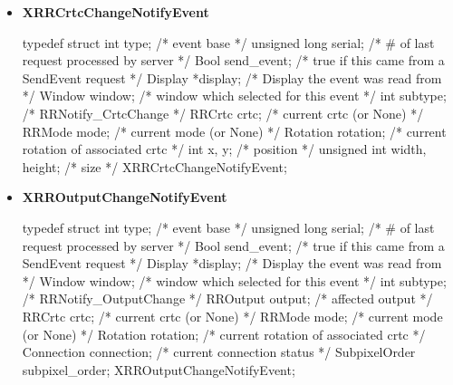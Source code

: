 \documentclass{report}
\begin{document}
\begin{itemize}
\begin{cppcode}
                    \end{cppcode}
                \item \textbf{XRRCrtcChangeNotifyEvent}
                    \bigbreak \noindent 
                    \begin{cppcode}
                        typedef struct {
                            int type;			/* event base */
                            unsigned long serial;	/* # of last request processed by server */
                            Bool send_event;		/* true if this came from a SendEvent request */
                            Display *display;		/* Display the event was read from */
                            Window window;		/* window which selected for this event */
                            int subtype;		/* RRNotify_CrtcChange */
                            RRCrtc crtc;    		/* current crtc (or None) */
                            RRMode mode;	    	/* current mode (or None) */
                            Rotation rotation;		/* current rotation of associated crtc */
                            int x, y;			/* position */
                            unsigned int width, height;	/* size */
                        } XRRCrtcChangeNotifyEvent;
                    \end{cppcode}
                \item \textbf{XRROutputChangeNotifyEvent}
                    \bigbreak \noindent 
                    \begin{cppcode}
                        typedef struct {
                            int type;			/* event base */
                            unsigned long serial;	/* # of last request processed by server */
                            Bool send_event;		/* true if this came from a SendEvent request */
                            Display *display;		/* Display the event was read from */
                            Window window;		/* window which selected for this event */
                            int subtype;		/* RRNotify_OutputChange */
                            RROutput output;		/* affected output */
                            RRCrtc crtc;	    	/* current crtc (or None) */
                            RRMode mode;	    	/* current mode (or None) */
                            Rotation rotation;		/* current rotation of associated crtc */
                            Connection connection;	/* current connection status */
                            SubpixelOrder subpixel_order;
                        } XRROutputChangeNotifyEvent;
                    \end{cppcode}

\end{itemize}
\end{document}
